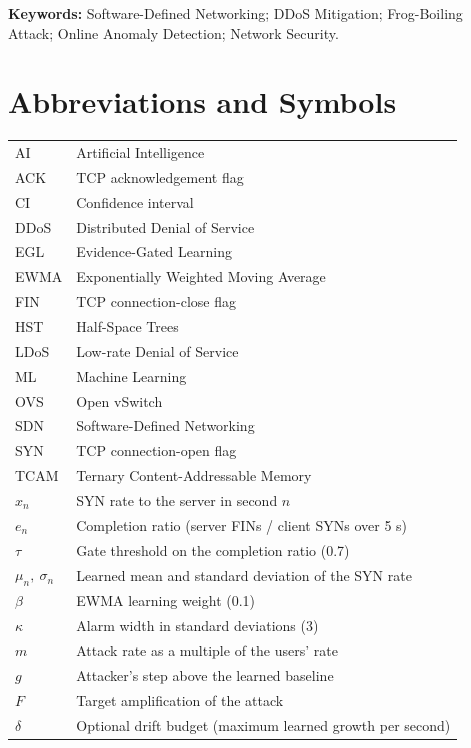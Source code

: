 \documentclass[12pt,a4paper,oneside]{report}
\begin{document}
\textbf{Keywords:} Software-Defined Networking; DDoS Mitigation; Frog-Boiling Attack; Online Anomaly Detection; Network Security.
\tableofcontents
\clearpage{}\listoffigures
\clearpage{}\listoftables
\chapter*{Abbreviations and Symbols}
\begin{tabular}{ll}AI & Artificial Intelligence\\ ACK & TCP acknowledgement flag\\ CI & Confidence interval\\ DDoS & Distributed Denial of Service\\ EGL & Evidence-Gated Learning\\ EWMA & Exponentially Weighted Moving Average\\ FIN & TCP connection-close flag\\ HST & Half-Space Trees\\ LDoS & Low-rate Denial of Service\\ ML & Machine Learning\\ OVS & Open vSwitch\\ SDN & Software-Defined Networking\\ SYN & TCP connection-open flag\\ TCAM & Ternary Content-Addressable Memory\\[4pt]
$x_n$ & SYN rate to the server in second $n$\\ $e_n$ & Completion ratio (server FINs / client SYNs over 5 s)\\ $\tau$ & Gate threshold on the completion ratio (0.7)\\ $\mu_n,\ \sigma_n$ & Learned mean and standard deviation of the SYN rate\\ $\beta$ & EWMA learning weight (0.1)\\ $\kappa$ & Alarm width in standard deviations (3)\\ $m$ & Attack rate as a multiple of the users' rate\\ $g$ & Attacker's step above the learned baseline\\ $F$ & Target amplification of the attack\\ $\delta$ & Optional drift budget (maximum learned growth per second)\end{tabular}
\clearpage{}
\end{document}
